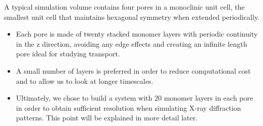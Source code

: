 \documentclass{article}
\newcommand{\angstrom}{\textup{\AA}}
\begin{document}
  A typical simulation volume contains four pores in a monoclinic unit cell,
  the smallest unit cell that maintains hexagonal symmetry when extended 
  periodically.
  \begin{itemize}
    \item Each pore is made of twenty stacked monomer layers with periodic 
    continuity in the z direction, avoiding any edge effects and creating an 
    infinite length pore ideal for studying transport.
    \item A small number of layers is preferred in order to reduce computational
    cost and to allow us to look at longer timescales.
    \item Ultimately, we chose to build a system with 20 monomer layers in each pore
    in order to obtain sufficient resolution when simulating X-ray diffraction patterns.
    This point will be explained in more detail later.
  \end{itemize}
 
\end{document}
